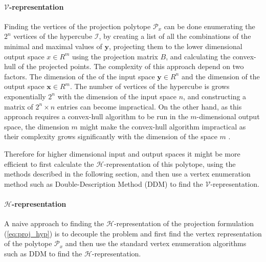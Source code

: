 \paragraph*{$\mathcal{V}$-representation} Finding the vertices of the projection polytope $\mathcal{P}_x$ can be done enumerating the $2^n$ vertices of the hypercube $\mathcal{I}$, by creating a list of all the combinations of the minimal and maximal values of $\bm{y}$, projecting them to the lower dimensional output space $x \in R^m$ using the projection matrix $B$, and calculating the convex-hull of the projected points. The complexity of this approach depend on two factors. The dimension of the of the input space $\bm{y} \in R^n$ and the dimension of the output space $\bm{x}\in R^m$. The number of vertices of the hypercube is grows exponentially $2^n$ with the dimension of the input space $n$, and constructing a matrix of $2^n \times n$ entries can become impractical. On the other hand, as this approach requires a convex-hull algorithm to be run in the $m$-dimensional output space, the dimension $m$ might make the convex-hull algorithm impractical as their complexity grows significantly with the dimension of the space $m$ \cite{Barber1996}.

Therefore for higher dimensional input and output spaces it might be more efficient to first calculate the $\mathcal{H}$-representation  of this polytope, using the methods described in the following section, and then use a vertex enumeration method such as Double-Description Method (DDM) \cite{fukuda_dd} to find the $\mathcal{V}$-representation.

\paragraph*{$\mathcal{H}$-representation} A naive approach to finding the $\mathcal{H}$-representation of the projection formulation (\ref{eq:proj_hyp}) is to decouple the problem and first find the vertex representation of the polytope $\mathcal{P}_x$ and then use the standard vertex enumeration algorithms such as DDM \cite{fukuda_dd} to find the $\mathcal{H}$-representation.

